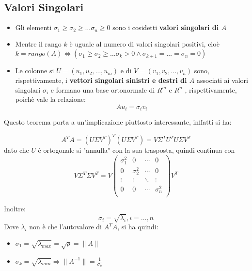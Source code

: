 \subsection{Valori Singolari}
\begin{itemize}
    \item Gli elementi $\sigma_1\geq\sigma_2\geq\dots\sigma_n\geq 0$ sono i cosidetti  \textbf{valori singolari di $A$}
    \item Mentre il rango $k$ è uguale al numero di valori singolari positivi, cioè $k=rango(A)\iff (\sigma_1\geq\sigma_2\geq\dots\sigma_k > 0\land \sigma_{k+1}=\dots = \sigma_n = 0)$
    \item Le colonne si $U=(u_1,u_2,\dots, u_m)$ e di $V=(v_1,v_2,\dots,v_n)$ sono, rispettivamente, i \textbf{vettori singolari sinistri e destri di $A$} associati ai valori singolari $\sigma_i$ e formano una base ortonormale di $R^m$ e $R^n$ , rispettivamente, poichè vale la relazione:
    \[
            Au_i = \sigma_i v_i
    \]
\end{itemize}


Questo teorema porta a un'implicazione piuttosto interessante, inffatti si ha: 

\[
    A^T A = (U\Sigma V^T)^T (U\Sigma V^T) = V\Sigma^T U^T U\Sigma V^T
\]
dato che $U$ è ortogonale si "annulla" con la sua trasposta, quindi continua con 
\[
    V\Sigma^T \Sigma V^T = V 
    \begin{pmatrix}
        \sigma_1^2 & 0 & \cdots & 0 \\
        0 & \sigma_2^2 & \cdots & 0 \\
        \vdots & \vdots & \ddots & \vdots \\
        0 & 0 & \cdots & \sigma_n^2 \\
    \end{pmatrix} V^T
\]

Inoltre:
\[
    \sigma_i =\sqrt{\lambda_i}, i=\dots,n 
\]
Dove $\lambda_i$ non è che l'autovalore di $A^TA$, si ha quindi:
\begin{itemize}
    \item $\sigma_1 =\sqrt{\lambda_{max}}=\sqrt{\rho}=\|A\|$
    \item $\sigma_k =\sqrt{\lambda_{min}} \Rightarrow \|A^{-1}\| = \frac{1}{\sigma_k}$
\end{itemize}


